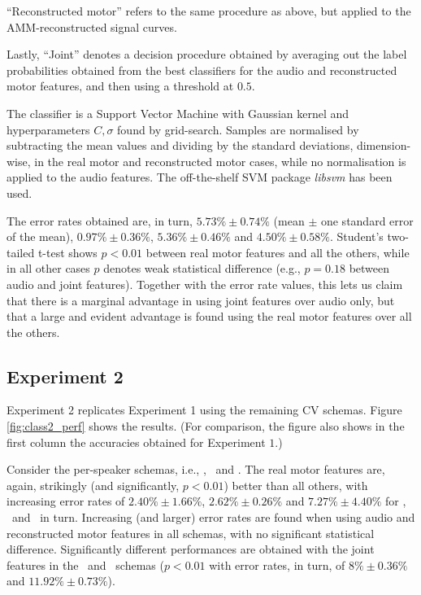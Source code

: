 ``Reconstructed motor'' refers to the same procedure as above, but applied
to the AMM-reconstructed signal curves.

Lastly, ``Joint'' denotes a decision procedure obtained by averaging out the
label probabilities obtained from the best classifiers for the audio and
reconstructed motor features, and then using a threshold at $0.5$.

The classifier is a Support Vector Machine \cite{BGV92} with Gaussian kernel
and hyperparameters $C, \sigma$ found by grid-search. Samples are normalised
by subtracting the mean values and dividing by the standard deviations,
dimension-wise, in the real motor and reconstructed motor cases, while
no normalisation is applied to the audio features. The off-the-shelf SVM
package \emph{libsvm} \cite{libsvm} has been used.

The error rates obtained are, in turn,
$5.73\% \pm 0.74\%$ (mean $\pm$ one standard error of the mean),
$0.97\% \pm 0.36\%$,
$5.36\% \pm 0.46\%$ and
$4.50\% \pm 0.58\%$. Student's two-tailed t-test shows $p<0.01$ between real motor features
and all the others, while in all other cases $p$ denotes weak statistical difference (e.g.,
$p=0.18$ between audio and joint features). Together with the error rate values, this lets
us claim that there is a marginal advantage in using joint features
over audio only, but that a large and evident advantage is found using the real motor features
over all the others.

\subsection{Experiment 2}
\label{subsec:exp2}

Experiment 2 replicates Experiment 1 using the remaining CV schemas.
Figure \ref{fig:class2_perf} shows the results. (For comparison,
the figure also shows in the first column the accuracies obtained for
Experiment $1$.)

Consider the per-speaker schemas, i.e., \spka, \spkb\ and \spkc. The real motor
features are, again, strikingly (and significantly, $p<0.01$) better than all others,
with increasing error rates of
$2.40\% \pm 1.66\%$,
$2.62\% \pm 0.26\%$ and
$7.27\% \pm 4.40\%$ for \spka, \spkb\ and \spkc\ in turn. Increasing (and larger) error
rates are found when using audio and reconstructed motor features in all schemas, with
no significant statistical difference. Significantly different performances are obtained
with the joint features in the \spkb\ and \spkc\ schemas ($p<0.01$ with error rates, in turn,
of $8\% \pm 0.36\%$ and $11.92\% \pm 0.73\%$).

